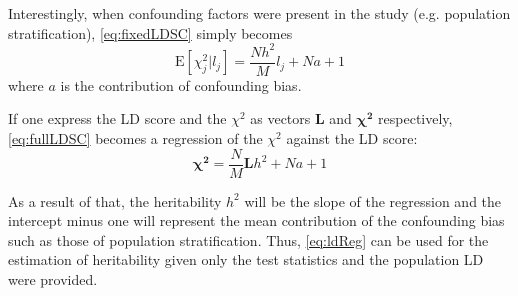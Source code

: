 	Interestingly, when confounding factors were present in the study (e.g. population stratification), \cref{eq:fixedLDSC} simply becomes
	\begin{equation}
	\mathrm{E}[\chi^2_j | l_j] = \frac{Nh^2}{M}l_j+Na+1
	\label{eq:fullLDSC}
	\end{equation}
	where $a$ is the contribution of confounding bias.
	
	If one express the \gls{LD} score and the $\chi^2$ as vectors $\boldsymbol{L}$ and $\boldsymbol{\chi^2}$ respectively, \cref{eq:fullLDSC} becomes a regression of the $\chi^2$ against the \gls{LD} score:
	\begin{equation}
	\boldsymbol{\chi^2}= \frac{N}{M}\boldsymbol{L}h^2+Na+1
	\label{eq:ldReg}
	\end{equation}
	
	As a result of that, the heritability $h^2$ will be the slope of the regression and the intercept minus one will represent the mean contribution of the confounding bias such as those of population stratification. 
	Thus, \cref{eq:ldReg} can be used for the estimation of heritability given only the test statistics and the population \gls{LD} were provided. 
	
